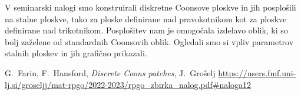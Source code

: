 \documentclass[a4paper,12pt]{article}
\begin{document}
V seminarski nalogi smo konstruirali diskretne Coonsove ploskve in jih posplošili na stalne
ploskve, tako za ploske definirane nad pravokotnikom kot za ploskve definirane nad 
trikotnikom. Posplošitev nam je omogočala
izdelavo oblik, ki so bolj zaželene od standardnih Coonsovih oblik. Ogledali smo 
si vpliv parametrov stalnih ploskev in jih grafično prikazali.

\newpage

\begin{thebibliography}{99}
   G.~Farin, F.~Hansford, \emph{Discrete Coons patches}, 
   J.~Grošelj \url{https://users.fmf.uni-lj.si/groseljj/mat-rpgo/2022-2023/rpgo_zbirka_nalog.pdf#naloga12}
\end{thebibliography}
\end{document}
